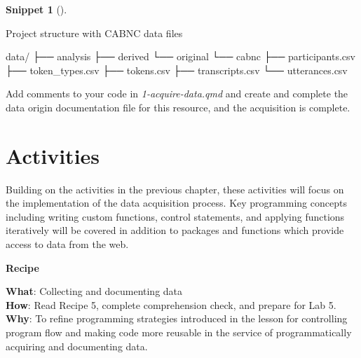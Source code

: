 \documentclass[
  letterpaper,
  krantz1]{latex/krantz-mod}
\newenvironment{Shaded}{\begin{snugshade}}{\end{snugshade}}
\newcommand{\ExtensionTok}[1]{\textcolor[rgb]{0.00,0.00,0.00}{#1}}
\newcommand{\NormalTok}[1]{\textcolor[rgb]{0.00,0.00,0.00}{#1}}
\theoremstyle{definition}
\newtheorem{definition}{Snippet}[chapter]
\theoremstyle{definition}
\theoremstyle{remark}
\begin{document}
\begin{definition}[]\protect\hypertarget{def-acquire-functions-output}{}\label{def-acquire-functions-output}

Project structure with CABNC data files

\begin{Shaded}
\begin{Highlighting}[]
\ExtensionTok{data/}
\ExtensionTok{├──}\NormalTok{ analysis}
\ExtensionTok{├──}\NormalTok{ derived}
\ExtensionTok{└──}\NormalTok{ original}
    \ExtensionTok{└──}\NormalTok{ cabnc}
        \ExtensionTok{├──}\NormalTok{ participants.csv}
        \ExtensionTok{├──}\NormalTok{ token\_types.csv}
        \ExtensionTok{├──}\NormalTok{ tokens.csv}
        \ExtensionTok{├──}\NormalTok{ transcripts.csv}
        \ExtensionTok{└──}\NormalTok{ utterances.csv}
\end{Highlighting}
\end{Shaded}

\end{definition}

Add comments to your code in \emph{1-acquire-data.qmd} and create and
complete the data origin documentation file for this resource, and the
acquisition is complete.

\section*{Activities}\label{activities-3}


Building on the activities in the previous chapter, these activities
will focus on the implementation of the data acquisition process. Key
programming concepts including writing custom functions, control
statements, and applying functions iteratively will be covered in
addition to packages and functions which provide access to data from the
web.

\begin{tcolorbox}[enhanced jigsaw, toprule=.15mm, breakable, colback=white, arc=.35mm, left=2mm, colframe=quarto-callout-color-frame, opacityback=0, bottomrule=.15mm, rightrule=.15mm, leftrule=.75mm]

\textbf{ Recipe}

\textbf{What}: Collecting and documenting data\\
\textbf{How}: Read Recipe 5, complete comprehension check, and prepare
for Lab 5.\\
\textbf{Why}: To refine programming strategies introduced in the lesson
for controlling program flow and making code more reusable in the
service of programmatically acquiring and documenting data.

\end{tcolorbox}
\end{document}
